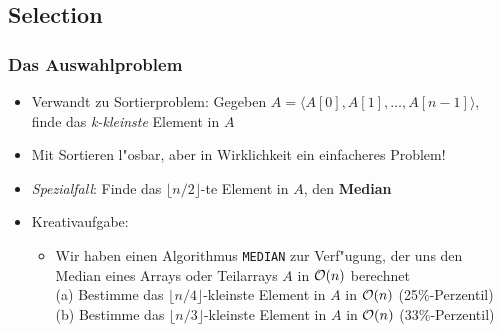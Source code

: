 \subsection{Selection}
\begin{frame}
  \frametitle{Das Auswahlproblem}
  \begin{itemize}
  \item Verwandt zu Sortierproblem: Gegeben $A = \langle A[0], A[1], \ldots, A[n-1] \rangle$,
        finde das \emph{k-kleinste} Element in $A$
  \item Mit Sortieren l"osbar, aber in Wirklichkeit ein einfacheres Problem!
  \item \emph{Spezialfall}: Finde das $\lfloor n/2 \rfloor$-te Element in $A$, den
        \textbf{Median}
  \item Kreativaufgabe:
    \begin{itemize}
    \item Wir haben einen Algorithmus \lstinline|MEDIAN| zur Verf"ugung,
          der uns den Median eines Arrays oder Teilarrays $A$ in
          $\mathcal{O}(n)$ berechnet \\[1em]
          (a) Bestimme das $\lfloor n/4 \rfloor$-kleinste
          Element in $A$ in $\mathcal{O}(n)$ (25\%-Perzentil)\\[0.3em]
          (b) Bestimme das $\lfloor n/3 \rfloor$-kleinste
          Element in $A$ in $\mathcal{O}(n)$ (33\%-Perzentil)
    \end{itemize}
  \end{itemize}
\end{frame}


